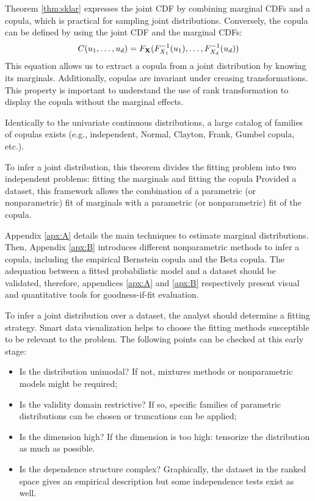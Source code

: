 Theorem \ref{thm:sklar} expresses the joint CDF by combining marginal CDFs and a copula, which is practical for sampling joint distributions. 
Conversely, the copula can be defined by using the joint CDF and the marginal CDFs: 
\begin{equation}
    C(u_1, \dots, u_d) = F_{{\bf X}}(F^{-1}_{X_1}(u_1), \dots, F^{-1}_{X_d}(u_d))
\end{equation}
This equation allows us to extract a copula from a joint distribution by knowing its marginals.
Additionally, copulas are invariant under creasing transformations. 
This property is important to understand the use of rank transformation to display the copula without the marginal effects.     


Identically to the univariate continuous distributions, a large catalog of families of copulas exists (e.g., independent, Normal, Clayton, Frank, Gumbel copula, etc.).


To infer a joint distribution, this theorem divides the fitting problem into two independent problems: fitting the marginals and fitting the copula
Provided a dataset, this framework allows the combination of a parametric (or nonparametric) fit of marginals with a parametric (or nonparametric) fit of the copula. 

Appendix \ref{apx:A} details the main techniques to estimate marginal distributions. 
Then, Appendix \ref{apx:B} introduces different nonparametric methods to infer a copula, including the empirical Bernstein copula and the Beta copula. 
The adequation between a fitted probabilistic model and a dataset should be validated, therefore, appendices \ref{apx:A} and \ref{apx:B} respectively present visual and quantitative tools for goodness-if-fit evaluation.

To infer a joint distribution over a dataset, the analyst should determine a fitting strategy.
Smart data visualization helps to choose the fitting methods susceptible to be relevant to the problem. 
The following points can be checked at this early stage: 
\begin{itemize}
    \item Is the distribution unimodal? If not, mixtures methods or nonparametric models might be required;
    \item Is the validity domain restrictive? If so, specific families of parametric distributions can be chosen or truncations can be applied;
    \item Is the dimension high? If the dimension is too high: tensorize the distribution as much as possible.
    \item Is the dependence structure complex? Graphically, the dataset in the ranked space gives an empirical description but some independence tests exist as well. 
\end{itemize} 



